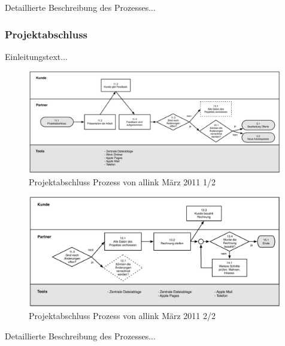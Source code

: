 Detaillierte Beschreibung des Prozesses...

\subsubsection{Projektabschluss}
Einleitungstext...

\begin{figure}[htbp]
\begin{center}
\includegraphics[width=0.99\textwidth,angle=0]{./bilder/03_ist_prozesse_abschluss_01.pdf}
\caption{Projektabschluss Prozess von allink März 2011 1/2}
\label{pic:03_ist_prozesse_abschluss_01}
\end{center}
\end{figure}

\begin{figure}[htbp]
\begin{center}
\includegraphics[width=0.99\textwidth,angle=0]{./bilder/03_ist_prozesse_abschluss_02.pdf}
\caption{Projektabschluss Prozess von allink März 2011 2/2}
\label{pic:03_ist_prozesse_abschluss_02}
\end{center}
\end{figure}

Detaillierte Beschreibung des Prozesses...
